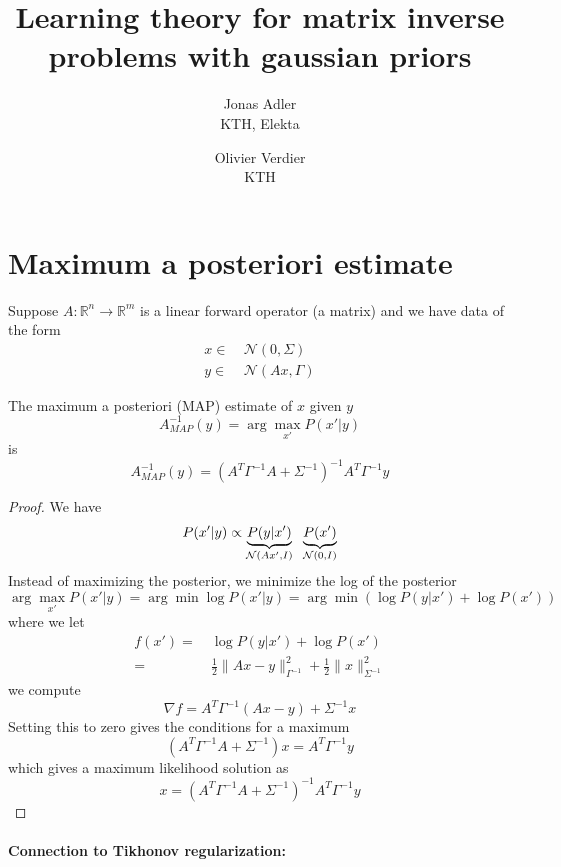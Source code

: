 \documentclass[a4paper,10pt]{article}
\title{Learning theory for matrix inverse problems with gaussian priors}
\author{Jonas Adler  \\ {\small KTH, Elekta} \and Olivier Verdier \\ {\small KTH}}
\date{}
\begin{document}
	\maketitle
	
\section{Maximum a posteriori estimate}

	Suppose $A : \mathbb{R}^n \to \mathbb{R}^m$ is a linear forward operator (a matrix) and we have data of the form
	\begin{align}
		x \in&\ \mathcal{N}(0, \Sigma) \nonumber \\
		y \in&\ \mathcal{N}(Ax, \Gamma) \label{eq:inv_prob}
	\end{align}	
	

  \begin{theorem}[{\cite[\S\,4.4]{Mu2012}}]
	The maximum a posteriori (MAP) estimate of $x$ given $y$
	\[
	    A^{-1}_{MAP}(y) = \arg\max_{x'} P(x' | y)
	\]
	is
	\[
		A^{-1}_{MAP}(y) = (A^T \Gamma^{-1} A + \Sigma^{-1})^{-1} A^T \Gamma^{-1} y
	\]
\end{theorem}

	\begin{proof} We have
	\[
		P(x' | y) \propto \underbrace{P(y | x')}_{\mathcal{N}(Ax', I)} \hspace{2mm} \underbrace{P(x')}_{\mathcal{N}(0, I)} 
	\]
	Instead of maximizing the posterior, we minimize the log of the posterior
	\[
		\arg\max_{x'} P(x' | y) = \arg\min \log P(x' | y) = \arg\min \left( \log P(y | x') + \log P(x') \right)
	\]
	where we let
	\begin{align*}
		f(x') =&\ \log P(y | x') + \log P(x') \\
		=&\ \frac{1}{2} \| Ax - y \|_{\Gamma^{-1}}^2 + \frac{1}{2} \| x \|_{\Sigma^{-1}}^2
	\end{align*}
	we compute
	\[
		\nabla f = A^T \Gamma^{-1} (Ax - y) + \Sigma^{-1} x
	\]
	Setting this to zero gives the conditions for a maximum
	\[
		(A^T \Gamma^{-1} A + \Sigma^{-1}) x = A^T \Gamma^{-1} y
	\]
	which gives a maximum likelihood solution as
	\[
		x = (A^T \Gamma^{-1} A + \Sigma^{-1})^{-1} A^T \Gamma^{-1} y
	\]
\end{proof}

	\paragraph{Connection to Tikhonov regularization:}
	
\end{document}
